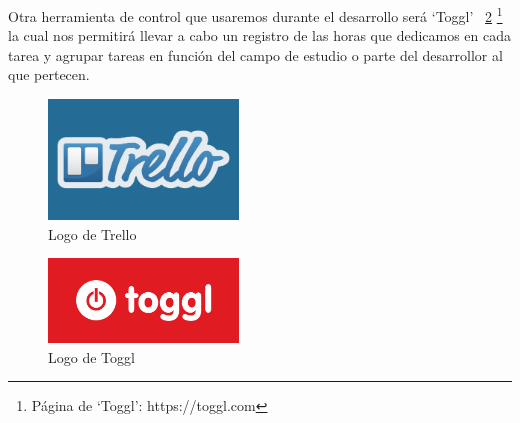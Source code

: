 Otra herramienta de control que usaremos durante el desarrollo será `Toggl'
~\ref{img:toggl} \footnote{Página de `Toggl': https://toggl.com}
la cual nos permitirá llevar a cabo un registro de las horas que dedicamos en cada tarea
y agrupar tareas en función del campo de estudio o parte del desarrollor al que pertecen.

\begin{figure}[ht]
\centering
\includegraphics[width=0.45\textwidth]{imagenes/metodologia/logo-trello.png}
\caption{Logo de Trello}
\label{img:trello}
\end{figure}

\begin{figure}[ht]
\centering
\includegraphics[width=0.45\textwidth]{imagenes/metodologia/logo-toggl.png}
\caption{Logo de Toggl}
\label{img:toggl}
\end{figure}